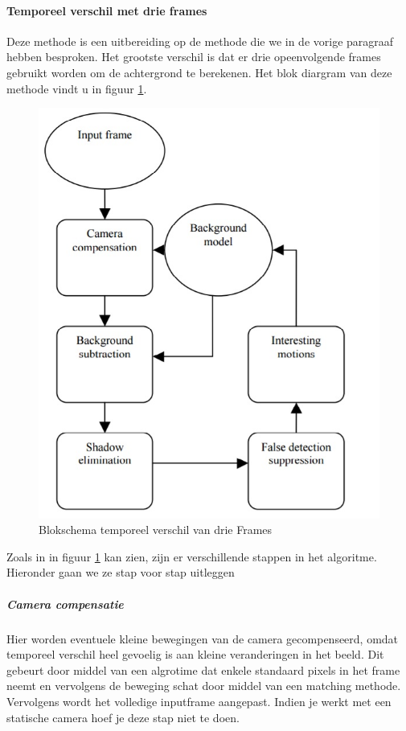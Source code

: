 \paragraph{Temporeel verschil met drie frames}
Deze methode is een uitbereiding op de methode die we in de vorige paragraaf hebben besproken. Het grootste verschil is dat er drie opeenvolgende frames gebruikt worden om de achtergrond te berekenen. Het blok diargram van deze methode vindt u in figuur \ref{imgTeV}. 

\begin{figure}[h]
	\includegraphics[scale=0.65]{TemporeelVerschilDrieFrames}
	\caption{Blokschema temporeel verschil van drie Frames}
	\label{imgTeV}
\end{figure}

Zoals in in figuur \ref{imgTeV} kan zien, zijn er verschillende stappen in het algoritme. Hieronder gaan we ze stap voor stap uitleggen

\subparagraph{Camera compensatie}
Hier worden eventuele kleine bewegingen van de camera gecompenseerd, omdat temporeel verschil heel gevoelig is aan kleine veranderingen in het beeld. Dit gebeurt door middel van een algrotime dat enkele standaard pixels in het frame neemt en vervolgens de beweging schat door middel van een matching methode. Vervolgens wordt het volledige inputframe aangepast.  Indien je werkt met een statische camera hoef je deze stap niet te doen.

